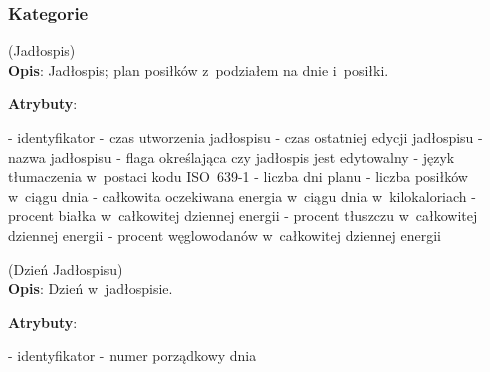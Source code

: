 \subsubsection{Kategorie}\label{subsubsec:database:mealplans:categories}
\begin{enumerate}[label={\textbf{KAT/4/\protect\twodigits{\theenumi}}}, wide, labelwidth=!, labelindent=0pt, labelsep=0pt, series=reqs]
    \setlength\itemsep{1.75em}
    \label{kat:MealPlan} (Jadłospis)\\
    \indent\textbf{Opis}: Jadłospis; plan posiłków z~podziałem na dnie i~posiłki.
    \par
    \textbf{Atrybuty}:
    \begin{itemize}[series=atr, wide, align=left, leftmargin=190pt]
        \label{kat:MealPlan:id}- identyfikator
        \label{kat:MealPlan:creationTimestamp}- czas utworzenia jadłospisu
        \label{kat:MealPlan:editTimestamp}- czas ostatniej edycji jadłospisu
        \label{kat:MealPlan:name}- nazwa jadłospisu
        \label{kat:MealPlan:isFinal}- flaga określająca czy jadłospis jest edytowalny
        \label{kat:MealPlan:language}- język tłumaczenia w~postaci kodu ISO~639-1
        \label{kat:MealPlan:numberOfDays}- liczba dni planu
        \label{kat:MealPlan:numberOfMealsPerDay}- liczba posiłków w~ciągu dnia
        \label{kat:MealPlan:totalDailyEnergy}- całkowita oczekiwana energia w~ciągu dnia w~kilokaloriach
        \label{kat:MealPlan:percentOfProtein}- procent białka w~całkowitej dziennej energii
        \label{kat:MealPlan:percentOfFat}- procent tłuszczu w~całkowitej dziennej energii
        \label{kat:MealPlan:percentOfCarbohydrates}- procent węglowodanów w~całkowitej dziennej energii
    \end{itemize}

    \label{kat:MealPlanDay} (Dzień Jadłospisu)\\
    \indent\textbf{Opis}: Dzień w~jadłospisie.
    \par
    \textbf{Atrybuty}:
    \begin{itemize}[series=atr, wide, align=left, leftmargin=190pt]
        \label{kat:MealPlanDay:id}- identyfikator
        \label{kat:MealPlanDay:ordinalNumber}- numer porządkowy dnia
    \end{itemize}


\end{enumerate}
